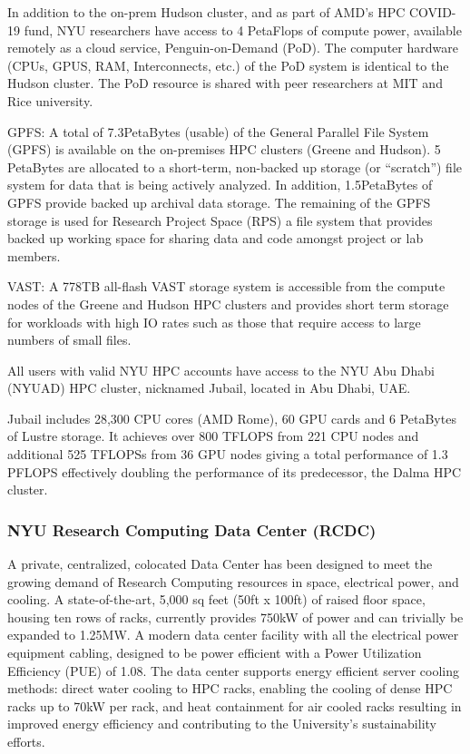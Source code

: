 In addition to the on-prem Hudson cluster, and as part of AMD’s HPC COVID-19 fund, NYU researchers have access to 4 PetaFlops of compute power, available remotely as a cloud service, Penguin-on-Demand (PoD). The computer hardware (CPUs, GPUS, RAM, Interconnects, etc.) of the PoD system is identical to the Hudson cluster. The PoD resource is shared with peer researchers at MIT and Rice university.

GPFS: A total of 7.3PetaBytes (usable) of the General Parallel File System (GPFS) is available on the on-premises HPC clusters (Greene and Hudson). 5 PetaBytes are allocated to a short-term, non-backed up storage (or “scratch”) file system for data that is being actively analyzed. In addition, 1.5PetaBytes of GPFS provide backed up archival data storage. The remaining of the GPFS storage is used for Research Project Space (RPS) a file system that  provides backed up working space for sharing data and code amongst project or lab members.

VAST: A 778TB all-flash VAST storage system is accessible from the compute nodes of the Greene and Hudson HPC clusters and provides short term storage for workloads with high IO rates such as those that require access to large numbers of small files.

All users with valid NYU HPC accounts have access to the NYU Abu Dhabi (NYUAD) HPC cluster, nicknamed Jubail, located in Abu Dhabi, UAE.

Jubail includes 28,300 CPU cores (AMD Rome), 60 GPU cards and 6 PetaBytes of Lustre storage. It achieves over 800 TFLOPS from 221 CPU nodes and additional 525 TFLOPSs from 36 GPU nodes giving a total performance of 1.3 PFLOPS effectively doubling the performance of its predecessor, the Dalma HPC cluster.

\subsubsection*{NYU Research Computing Data Center (RCDC)}

A private, centralized, colocated Data Center has been designed to meet the growing demand of  Research Computing resources in space, electrical power, and cooling. A state-of-the-art, 5,000 sq feet (50ft x 100ft) of raised floor space, housing ten rows of racks, currently provides 750kW of power and can trivially be expanded to 1.25MW. A modern data center facility with all the electrical power equipment cabling, designed to be power efficient with a Power Utilization Efficiency (PUE) of 1.08. The data center supports energy efficient server cooling methods: direct water cooling to HPC racks, enabling the cooling of dense HPC racks up to 70kW per rack, and heat containment for air cooled racks resulting in improved energy efficiency and contributing to the University's sustainability efforts.

